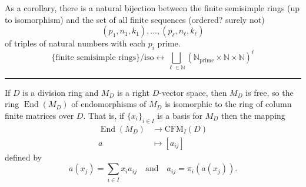 \documentclass[12pt]{article}
\newcommand{\sepline}{\rule{\textwidth}{0.4pt}}
\theoremstyle{definition}
\newcommand{\isp}[1]{\quad\text{#1}\quad}
\newcommand{\N}{\mathbb{N}}
\newcommand{\<}{\left\langle}
\renewcommand{\>}{\right\rangle}
\newcommand{\To}{\longrightarrow}
\newcommand{\Mapsto}{\longmapsto}
\DeclareMathOperator{\End}{End}
\renewcommand{\_}[1]{{_{#1}}}
\begin{document}
As a corollary, there is a natural bijection between the finite semisimple rings (up to isomorphism) and the set of all finite sequences (ordered? surely not)
\[
    (p_1, n_1, k_1), \dots, (p_\ell, n_\ell, k_\ell)
\]
of triples of natural numbers with each $p_i$ prime.
\[
    \{\text{finite semisimple rings}\}/\text{iso} \longleftrightarrow \bigsqcup_{\ell \in \N} (\N_{\mathrm{prime}} \times \N \times \N)^\ell
\]

\sepline

If $D$ is a division ring and $M_D$ is a right $D$-vector space, then $M_D$ is free, so the ring $\End(M_D)$ of endomorphisms of $M_D$ is isomorphic to the ring of column finite matrices over $D$.
That is, if $\{x_i\}_{i \in I}$ is a basis for $M_D$ then the mapping
\begin{align*}
    \End(M_D) &\To \mathrm{CFM}_I(D) \\
    a &\Mapsto [a_{ij}]
\end{align*}
defined by
\[
    a(x_j) = \sum_{i \in I} x_i a_{ij} \isp{and} a_{ij} = \pi_i(a(x_j)).
\]
\end{document}
